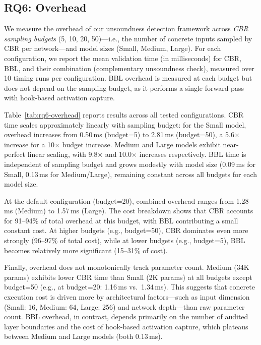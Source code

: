 \subsection{RQ6: Overhead}

We measure the overhead of our unsoundness detection framework across
\emph{CBR sampling budgets} (5, 10, 20, 50)---i.e., the number of concrete
inputs sampled by CBR per network---and model sizes (Small, Medium, Large).
For each configuration, we report the mean validation time (in milliseconds)
for CBR, BBL, and their combination (complementary unsoundness check),
measured over 10 timing runs per configuration. BBL overhead is measured
at each budget but does not depend on the sampling budget, as it performs
a single forward pass with hook-based activation capture.

Table~\ref{tab:rq6-overhead} reports results across all tested configurations.
CBR time scales approximately linearly with sampling budget: for the Small
model, overhead increases from 0.50\,ms (budget=5) to 2.81\,ms (budget=50),
a 5.6$\times$ increase for a 10$\times$ budget increase. Medium and Large
models exhibit near-perfect linear scaling, with 9.8$\times$ and 10.0$\times$
increases respectively. BBL time is independent of sampling budget and grows
modestly with model size (0.09\,ms for Small, 0.13\,ms for Medium/Large),
remaining constant across all budgets for each model size.

At the default configuration (budget=20), combined overhead ranges from
1.28\,ms (Medium) to 1.57\,ms (Large). The cost breakdown shows that CBR
accounts for 91--94\% of total overhead at this budget, with BBL contributing
a small constant cost. At higher budgets (e.g., budget=50), CBR dominates
even more strongly (96--97\% of total cost), while at lower budgets
(e.g., budget=5), BBL becomes relatively more significant (15--31\% of cost).



Finally, overhead does not monotonically track parameter count. Medium
(34K params) exhibits lower CBR time than Small (2K params) at all budgets
except budget=50 (e.g., at budget=20: 1.16\,ms vs.\ 1.34\,ms). This suggests
that concrete execution cost is driven more by architectural factors---such
as input dimension (Small: 16, Medium: 64, Large: 256) and network depth---than
raw parameter count. BBL overhead, in contrast, depends primarily on the number
of audited layer boundaries and the cost of hook-based activation capture,
which plateaus between Medium and Large models (both 0.13\,ms).

